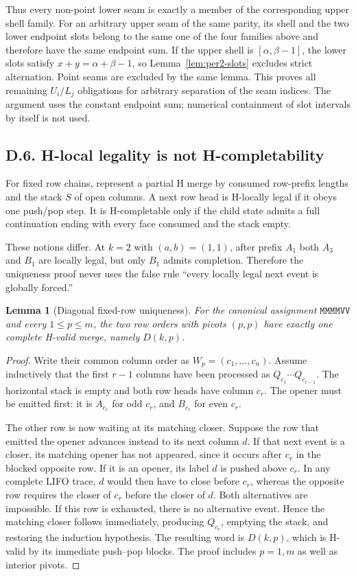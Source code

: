 \documentclass[11pt]{article}
\newtheorem{lemma}[theorem]{Lemma}
\theoremstyle{definition}
\theoremstyle{remark}
\begin{document}
Thus every non-point lower seam is exactly a member of the corresponding
upper shell family. For an arbitrary upper seam of the same parity, its
shell and the two lower endpoint slots belong to the same one of the four
families above and therefore have the same endpoint sum. If the upper
shell is $[\alpha,\beta-1]$, the lower slots satisfy
$x+y=\alpha+\beta-1$, so Lemma~\ref{lem:per2-slots} excludes strict
alternation. Point seams are excluded by the same lemma. This proves all
remaining $U_i/L_j$ obligations for arbitrary separation of the seam
indices. The argument uses the constant endpoint sum; numerical
containment of slot intervals by itself is not used.

\subsection{D.6. H-local legality is not
H-completability}\label{d.6.-h-local-legality-is-not-h-completability}

For fixed row chains, represent a partial H merge by consumed row-prefix
lengths and the stack \(S\) of open columns. A next row head is
H-locally legal if it obeys one push/pop step. It is H-completable only
if the child state admits a full continuation ending with every face
consumed and the stack empty.

These notions differ. At \(k=2\) with \((a,b)=(1,1)\), after prefix
\(A_1\) both \(A_3\) and \(B_1\) are locally legal, but only \(B_1\)
admits completion. Therefore the uniqueness proof never uses the false
rule ``every locally legal next event is globally forced.''

\begin{lemma}[Diagonal fixed-row uniqueness]\label{lem:per2-diagonal}
For the canonical assignment $\texttt{MMMMVV}$ and every
$1\le p\le m$, the two row orders with pivots $(p,p)$ have exactly one
complete H-valid merge, namely $D(k,p)$.
\end{lemma}
\begin{proof}
Write their common column order as $W_p=(c_1,\ldots,c_n)$.
Assume inductively that the first $r-1$ columns have been processed as
$Q_{c_1}\cdots Q_{c_{r-1}}$. The horizontal stack is empty and both row
heads have column $c_r$. The opener must be emitted first: it is
$A_{c_r}$ for odd $c_r$, and $B_{c_r}$ for even $c_r$.

The other row is now waiting at its matching closer. Suppose the row
that emitted the opener advances instead to its next column $d$.
If that next event is a closer, its matching opener has not appeared,
since it occurs after $c_r$ in the blocked opposite row. If it is an
opener, its label $d$ is pushed above $c_r$. In any complete LIFO trace,
$d$ would then have to close before $c_r$, whereas the opposite row
requires the closer of $c_r$ before the closer of $d$. Both alternatives
are impossible. If this row is exhausted, there is no alternative event.
Hence the matching closer follows immediately, producing $Q_{c_r}$,
emptying the stack, and restoring the induction hypothesis.
The resulting word is $D(k,p)$, which is H-valid by its immediate
push--pop blocks. The proof includes $p=1,m$ as well as interior pivots.
\end{proof}
\end{document}
